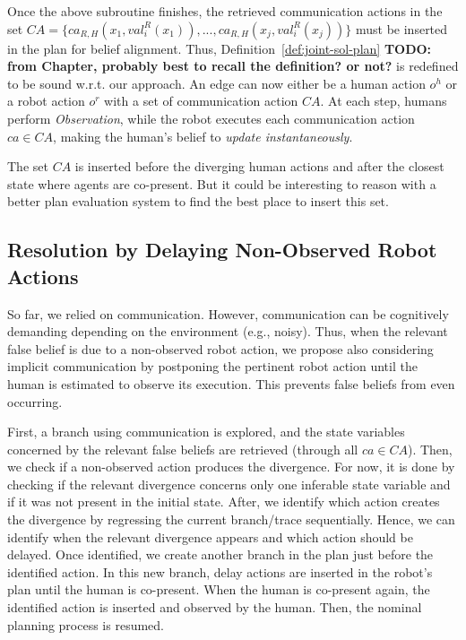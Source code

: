 {Once the above subroutine finishes, the retrieved communication actions in the set $\mathit{CA} = \{ ca_{R, H}(x_1,val^R_i(x_1)),..., ca_{R, H}(x_j,val^R_i(x_j)) \}$ must be inserted in the plan for belief alignment. Thus, Definition~\ref{def:joint-sol-plan} \textbf{TODO: from Chapter, probably best to recall the definition? or not?} is redefined to be sound w.r.t. our approach. An edge can now either be a human action $o^h$ or a robot action $o^r$ with a set of communication action $CA$.
At each step, humans perform \textit{Observation}, while the robot executes each communication action $ca \in \mathit{CA}$, making the human's belief to \textit{update instantaneously}.

The set $\mathit{CA}$ is inserted before the diverging human actions and after the closest state where agents are co-present. 
But it could be interesting to reason with a better plan evaluation system to find the best place to insert this set.

    \subsection{Resolution by Delaying Non-Observed Robot Actions}

So far, we relied on communication. However, communication can be cognitively demanding depending on the environment (e.g., noisy). 
Thus, when the relevant false belief is due to a non-observed robot action, we propose also considering implicit communication by postponing the pertinent robot action until the human is estimated to observe its execution. 
This prevents false beliefs from even occurring.

First, a branch using communication is explored, and the state variables concerned by the relevant false beliefs are retrieved (through all $ca \in CA$).
Then, we check if a non-observed action produces the divergence. For now, it is done by checking if the relevant divergence concerns only one inferable state variable and if it was not present in the initial state.   
After, we identify which action creates the divergence by regressing the current branch/trace sequentially. Hence, we can identify when the relevant divergence appears and which action should be delayed.
Once identified, we create another branch in the plan just before the identified action. In this new branch, {\sc delay} actions are inserted in the robot's plan until the human is co-present. When the human is co-present again, the identified action is inserted and observed by the human. Then, the nominal planning process is resumed.  

}
